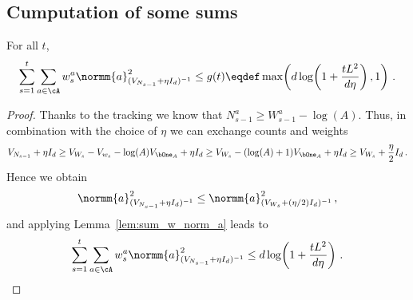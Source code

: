 

\subsection{Cumputation of some sums}
\begin{lemma} For all $t$,
\label{lem:computation_sum_w_a_N}
\[
\sum_{s=1}^t \sum_{a\in\cA} w_s^{a} \normm{ a }_{(V_{N_{s-1}}+\eta I_d)^{-1}}^2 \leq g(t)\eqdef \max\!\left(d \log\!\left(1 +\frac{t L^2}{d \eta} \right),1 \right) \,.
\]
\end{lemma}

\begin{proof}
Thanks to the tracking we know that $N_{s-1}^a \geq W_{s-1}^a -\log(A)$. Thus, in combination with the choice of $\eta$  we can exchange counts and weights
\begin{align*}
  V_{N_{s-1}} + \eta I_d \geq V_{W_{s}} - V_{w_s} - \log(A) V_{\bOne_A} +\eta I_d \geq  V_{W_{s}} - (\log(A)+1) V_{\bOne_A} +\eta I_d \geq V_{W_{s}}+ \frac{\eta}{2} I_d\,.
\end{align*}
Hence we obtain
\[
\normm{ a }_{(V_{N_{s-1}}+\eta I_d)^{-1}}^2 \leq \normm{ a }_{(V_{W_{s}}+(\eta/2) I_d)^{-1}}^2\,,
\]
and applying Lemma~\ref{lem:sum_w_norm_a} leads to
\[
\sum_{s=1}^t \sum_{a\in\cA} w_s^{a} \normm{ a }_{(V_{N_{s-1}}+\eta I_d)^{-1}}^2 \leq d \log\!\left(1 +\frac{t L^2}{d \eta} \right)\,.
\]
\end{proof}


